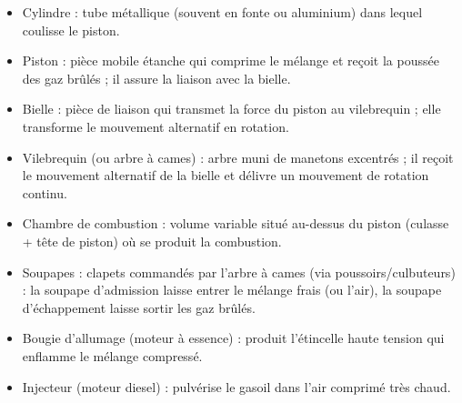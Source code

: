 \documentclass[11pt]{article}
\newcommand{\cle}[1]{{\popxbold\color{popdark}#1}}
\begin{document}
\begin{propriete}
\begin{itemize}
\item \cle{Cylindre} : tube métallique (souvent en fonte ou aluminium) dans lequel coulisse le piston.
\item \cle{Piston} : pièce mobile étanche qui comprime le mélange et reçoit la poussée des gaz brûlés ; il assure la liaison avec la bielle.
\item \cle{Bielle} : pièce de liaison qui transmet la force du piston au vilebrequin ; elle transforme le mouvement alternatif en rotation.
\item \cle{Vilebrequin} (ou arbre à cames) : arbre muni de manetons excentrés ; il reçoit le mouvement alternatif de la bielle et délivre un mouvement de rotation continu.
\item \cle{Chambre de combustion} : volume variable situé au-dessus du piston (culasse + tête de piston) où se produit la combustion.
\item \cle{Soupapes} : clapets commandés par l'arbre à cames (via poussoirs/culbuteurs) : la \cle{soupape d'admission} laisse entrer le mélange frais (ou l'air), la \cle{soupape d'échappement} laisse sortir les gaz brûlés.
\item \cle{Bougie d'allumage} (moteur à essence) : produit l'étincelle haute tension qui enflamme le mélange compressé.
\item \cle{Injecteur} (moteur diesel) : pulvérise le gasoil dans l'air comprimé très chaud.
\end{itemize}
\end{propriete}
\end{document}
